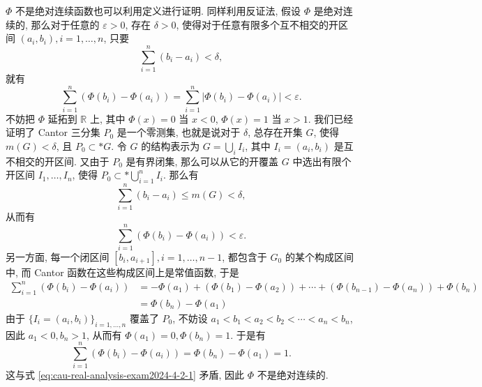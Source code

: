 \begin{solution}
\begin{enumerate}
    \(\Phi\) 不是绝对连续函数也可以利用定义进行证明. 同样利用反证法, 假设 \(\Phi\) 是绝对连续的,  那么对于任意的 \(\varepsilon > 0\), 存在 \(\delta > 0\), 使得对于任意有限多个互不相交的开区间 \((a_i, b_i), i = 1, \dots, n\), 只要
    \[\sum\limits_{i=1}^{n} (b_i - a_i) < \delta,\]
    就有
    \[\sum\limits_{i=1}^{n} (\Phi(b_i) - \Phi(a_i)) = \sum\limits_{i=1}^{n} \lvert \Phi(b_i) - \Phi(a_i) \rvert < \varepsilon.\]
    不妨把 \(\Phi\) 延拓到 \(\mathbb{R}\) 上, 其中 \(\Phi(x) = 0\) 当 \(x < 0\), \(\Phi(x) = 1\) 当 \(x > 1\). 我们已经证明了 Cantor 三分集 \(P_0\) 是一个零测集, 也就是说对于 \(\delta\), 总存在开集 \(G\), 使得 \(m(G) < \delta\), 且 \(P_0 \subset* G\). 令 \(G\) 的结构表示为 \(G = \bigcup\limits_{i} I_i\), 其中 \(I_i = (a_i, b_i)\) 是互不相交的开区间. 又由于 \(P_0\) 是有界闭集, 那么可以从它的开覆盖 \(G\) 中选出有限个开区间 \(I_1, \dots, I_n\), 使得 \(P_0 \subset* \bigcup\limits_{i=1}^{n} I_i\). 那么有
    \[\sum\limits_{i=1}^{n} (b_i - a_i) \leqslant m(G) < \delta,\]
    从而有
    \begin{equation}
    \label{eq:cau-real-analysis-exam2024-4-2-1}
    \sum\limits_{i=1}^{n} (\Phi(b_i) - \Phi(a_i)) < \varepsilon.
    \end{equation}
    另一方面, 每一个闭区间 \([b_i, a_{i+1}], i = 1, \dots, n-1\), 都包含于 \(G_0\) 的某个构成区间中, 而 Cantor 函数在这些构成区间上是常值函数, 于是
    \[\begin{aligned}
    \sum\limits_{i=1}^{n} (\Phi(b_i) - \Phi(a_i)) & = -\Phi(a_1) + (\Phi(b_1) - \Phi(a_2)) + \cdots + (\Phi(b_{n-1}) - \Phi(a_n)) + \Phi(b_n) \\
    & = \Phi(b_n) - \Phi(a_1)
    \end{aligned}\]
    由于 \(\{I_i = (a_i, b_i)\}_{i = 1, \dots, n}\) 覆盖了 \(P_0\), 不妨设 \(a_1 < b_1 < a_2 < b_2 < \cdots < a_n < b_n\), 因此 \(a_1 < 0, b_n > 1\), 从而有 \(\Phi(a_1) = 0, \Phi(b_n) = 1\). 于是有
    \[\sum\limits_{i=1}^{n} (\Phi(b_i) - \Phi(a_i)) = \Phi(b_n) - \Phi(a_1) = 1.\]
    这与式 \eqref{eq:cau-real-analysis-exam2024-4-2-1} 矛盾, 因此 \(\Phi\) 不是绝对连续的.
  \end{enumerate}
\end{solution}


